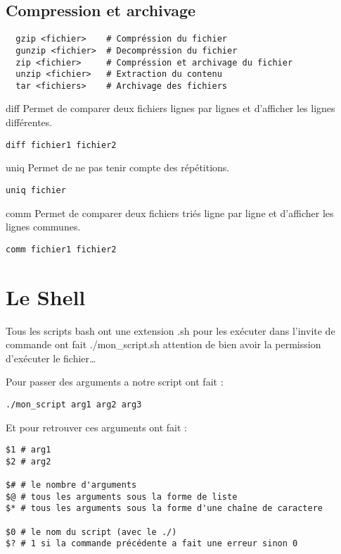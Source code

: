 \documentclass{article}
\begin{document}
\subsection{Compression et archivage}
\begin{verbatim}
  gzip <fichier>    # Compréssion du fichier
  gunzip <fichier>  # Decompréssion du fichier
  zip <fichier>     # Compréssion et archivage du fichier
  unzip <fichier>   # Extraction du contenu
  tar <fichiers>    # Archivage des fichiers
\end{verbatim}

diff
Permet de comparer deux fichiers lignes par lignes et d'afficher les lignes différentes.
\begin{verbatim}
diff fichier1 fichier2
\end{verbatim}

uniq
Permet de ne pas tenir compte des répétitions.
\begin{verbatim}
uniq fichier
\end{verbatim}

comm
Permet de comparer deux fichiers triés ligne par ligne et d'afficher les lignes communes.
\begin{verbatim}
comm fichier1 fichier2
\end{verbatim}

\section{Le Shell}

Tous les scripts bash ont une extension .sh pour les exécuter dans l'invite de commande ont fait ./mon\_script.sh attention de bien avoir la permission d'exécuter le fichier\dots

Pour passer des arguments a notre script ont fait :
\begin{verbatim}
./mon_script arg1 arg2 arg3
\end{verbatim}

Et pour retrouver ces arguments ont fait :

\begin{verbatim}
$1 # arg1
$2 # arg2

$# # le nombre d'arguments
$@ # tous les arguments sous la forme de liste
$* # tous les arguments sous la forme d'une chaîne de caractere

$0 # le nom du script (avec le ./)
$? # 1 si la commande précédente a fait une erreur sinon 0
\end{verbatim}
\end{document}
